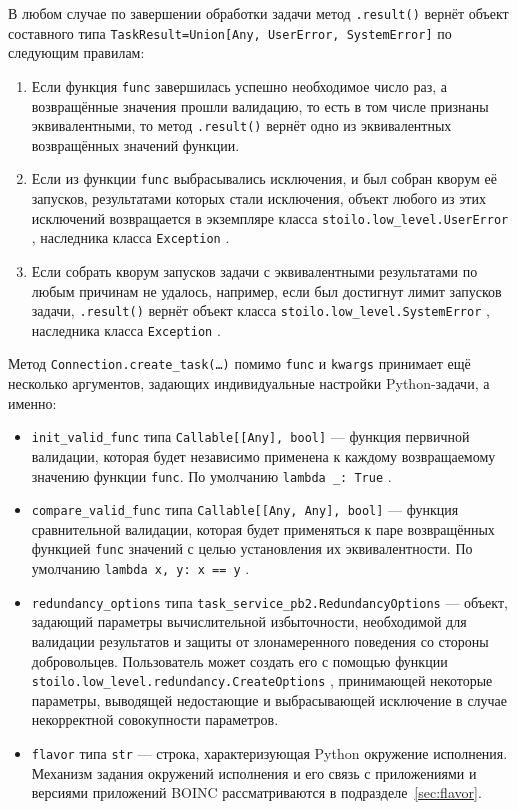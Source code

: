 \documentclass[a4paper,12pt]{extarticle}
\newcommand{\code}[1]{%
    \begingroup
    \setlength{\fboxsep}{1.2pt}%
    \colorbox{inlinecodebg}{\texttt{\textcolor{inlinecodefg}{#1}}}%
    \endgroup
}
\begin{document}
В любом случае по завершении обработки задачи метод \code{.result()} вернёт объект составного типа \code{TaskResult=Union[Any, UserError, SystemError]} по следующим правилам:
\begin{enumerate}
    \item[1.] Если функция \texttt{func} завершилась успешно необходимое число раз, а возвращённые значения прошли валидацию, то есть в том числе признаны эквивалентными, то метод \code{.result()} вернёт одно из эквивалентных возвращённых значений функции.
    \item[2.] Если из функции \texttt{func} выбрасывались исключения, и был собран кворум её запусков, результатами которых стали исключения, объект любого из этих исключений возвращается в экземпляре класса \code{stoilo.low\_level.UserError}, наследника класса \code{Exception}.
    \item[3.] Если собрать кворум запусков задачи с эквивалентными результатами по любым причинам не удалось, например, если был достигнут лимит запусков задачи, \code{.result()} вернёт объект класса \code{stoilo.low\_level.SystemError}, наследника класса \code{Exception}.
\end{enumerate}

Метод \code{Connection.create\_task(\ldots)} помимо \texttt{func} и \texttt{kwargs} принимает ещё несколько аргументов, задающих индивидуальные настройки Python-задачи, а именно:
\begin{itemize}
    \item \texttt{init\_valid\_func} типа \code{Callable[[Any], bool]} — функция первичной валидации, которая будет независимо применена к каждому возвращаемому значению функции \texttt{func}.
    По умолчанию \code{lambda \_: True}.
    \item \texttt{compare\_valid\_func} типа \code{Callable[[Any, Any], bool]} — функция сравнительной валидации, которая будет применяться к паре возвращённых функцией \texttt{func} значений с целью установления их эквивалентности.
    По умолчанию \code{lambda x, y: x == y}.
    \item \texttt{redundancy\_options} типа \code{task\_service\_pb2.RedundancyOptions} — объект, задающий параметры вычислительной избыточности, необходимой для валидации результатов и защиты от злонамеренного поведения со стороны добровольцев.
    Пользователь может создать его с помощью функции \code{stoilo.low\_level.redundancy.CreateOptions}, принимающей некоторые параметры, выводящей недостающие и выбрасывающей исключение в случае некорректной совокупности параметров.
    \item \texttt{flavor} типа \code{str} — строка, характеризующая Python окружение исполнения.
    Механизм задания окружений исполнения и его связь с приложениями и версиями приложений BOINC рассматриваются в подразделе~\ref{sec:flavor}.
\end{itemize}
\end{document}
